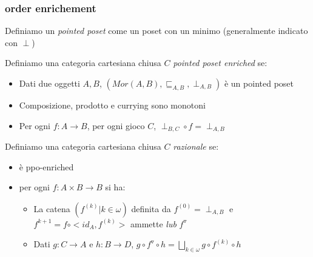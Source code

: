 \documentclass{beamer}
\begin{document}
\begin{frame}
	
	\frametitle{order enrichement}
	
	Definiamo un \emph{pointed poset} come un poset con un minimo (generalmente indicato con $\perp$)
	
	Definiamo una categoria cartesiana chiusa $C$ \emph{pointed poset enriched} se:
	\begin{itemize}
		\item Dati due oggetti $A,B$, $(Mor(A,B),\sqsubseteq _{A,B},\perp _{A,B})$ è un pointed poset
		\item Composizione, prodotto e currying sono monotoni
		\item Per ogni $f: A\rightarrow B$, per ogni gioco $C$, $\perp_{B,C} \circ f = \perp _{A,B}$
	\end{itemize}
	
	Definiamo una categoria cartesiana chiusa $C$ \emph{razionale} se:
	\begin{itemize}
		\item è ppo-enriched
		\item per ogni $f: A\times B \rightarrow B$ si ha:
		\begin{itemize}
			\item La catena $(f^{(k)} | k\in \omega)$ definita da $f^{(0)}=\perp _{A,B}$ e $f^{k+1} = f \circ <id_A , f^{(k)}>$ ammette \emph{lub} $f^{\triangledown}$
			\item Dati $g:C\rightarrow A$ e $h:B\rightarrow D$, $g\circ f^\triangledown \circ h = \bigsqcup_{k\in \omega} g \circ f^{(k)} \circ h$
		\end{itemize}

	\end{itemize}
	
\end{frame}
\end{document}

